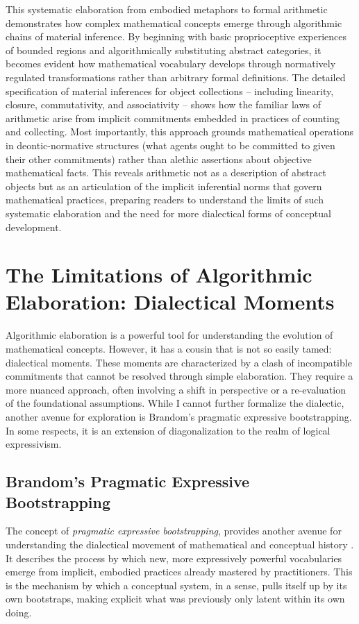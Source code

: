 \documentclass[12pt]{book}
\begin{document}
This systematic elaboration from embodied metaphors to formal arithmetic demonstrates how complex mathematical concepts emerge through algorithmic chains of material inference. By beginning with basic proprioceptive experiences of bounded regions and algorithmically substituting abstract categories, it becomes evident how mathematical vocabulary develops through normatively regulated transformations rather than arbitrary formal definitions. The detailed specification of material inferences for object collections -- including linearity, closure, commutativity, and associativity -- shows how the familiar laws of arithmetic arise from implicit commitments embedded in practices of counting and collecting. Most importantly, this approach grounds mathematical operations in deontic-normative structures (what agents ought to be committed to given their other commitments) rather than alethic assertions about objective mathematical facts. This reveals arithmetic not as a description of abstract objects but as an articulation of the implicit inferential norms that govern mathematical practices, preparing readers to understand the limits of such systematic elaboration and the need for more dialectical forms of conceptual development.



\section{The Limitations of Algorithmic Elaboration: Dialectical Moments}
Algorithmic elaboration is a powerful tool for understanding the evolution of mathematical concepts. However, it has a cousin that is not so easily tamed: dialectical moments. These moments are characterized by a clash of incompatible commitments that cannot be resolved through simple elaboration. They require a more nuanced approach, often involving a shift in perspective or a re-evaluation of the foundational assumptions. While I cannot further formalize the dialectic, another avenue for exploration is Brandom's pragmatic expressive bootstrapping. In some respects, it is an extension of diagonalization to the realm of logical expressivism. 

\subsection{Brandom's Pragmatic Expressive Bootstrapping}

The concept of \textit{pragmatic expressive bootstrapping}, provides another avenue for understanding the dialectical movement of mathematical and conceptual history \parencite{Brandom2008}. It describes the process by which new, more expressively powerful vocabularies emerge from implicit, embodied practices already mastered by practitioners. This is the mechanism by which a conceptual system, in a sense, pulls itself up by its own bootstraps, making explicit what was previously only latent within its own doing.
\end{document}
